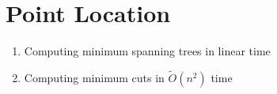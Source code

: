 \section{Point Location}

\begin{tcolorbox}[title=Sections, colback=blue!10, colframe=blue]
    \begin{enumerate}
        \item Computing minimum spanning trees in linear time
        \item Computing minimum cuts in $\tilde{O}(n^2)$ time
    \end{enumerate}
\end{tcolorbox}
